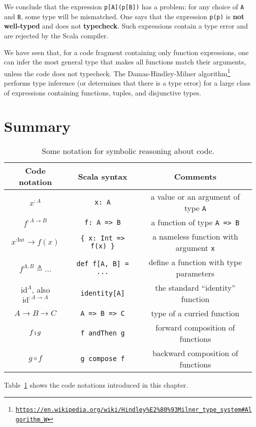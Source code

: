 We conclude that the expression \lstinline!p[A](p[B])! has a problem:
for any choice of \lstinline!A! and \lstinline!B!, some type will
be mismatched. One says that the expression \lstinline!p(p)! is \textbf{not
well-typed} and does not \textbf{typecheck}.
Such expressions contain a type error and are rejected by the Scala
compiler. 

We have seen that, for a code fragment containing only function expressions,
one can infer the most general type that makes all functions match
their arguments, unless the code does not typecheck. The Damas-Hindley-Milner
algorithm\footnote{\texttt{\href{https://en.wikipedia.org/wiki/Hindley\%E2\%80\%93Milner_type_system\#Algorithm_W}{https://en.wikipedia.org/wiki/Hindley\%E2\%80\%93Milner\_type\_system\#Algorithm\_W}}}
performs type inference (or determines that
there is a type error) for a large class of expressions containing
functions, tuples, and disjunctive types.

\section{Summary}

\begin{table}
\begin{centering}
\begin{tabular}{|c|c|c|}
\hline 
\textbf{\small{}Code notation} & \textbf{\small{}Scala syntax} & \textbf{\small{}Comments}\tabularnewline
\hline 
\hline 
{\small{}$x^{:A}$} & {\small{}}\lstinline!x: A! & {\small{}a value or an argument of type }\lstinline!A!\tabularnewline
\hline 
{\small{}$f^{:A\rightarrow B}$} & {\small{}}\lstinline!f: A => B! & {\small{}a function of type }\lstinline!A => B!\tabularnewline
\hline 
{\small{}$x^{:\text{Int}}\rightarrow f(x)$} & {\small{}}\lstinline!{ x: Int => f(x) }! & {\small{}a nameless function with argument }\lstinline!x!\tabularnewline
\hline 
{\small{}$f^{A,B}\triangleq...$} & {\small{}}\lstinline!def f[A, B] = ...! & {\small{}define a function with type parameters}\tabularnewline
\hline 
{\small{}$\text{id}^{A}$, also $\text{id}^{:A\rightarrow A}$} & {\small{}}\lstinline!identity[A]! & {\small{}the standard ``identity'' function}\tabularnewline
\hline 
{\small{}$A\rightarrow B\rightarrow C$} & {\small{}}\lstinline!A => B => C! & {\small{}type of a curried function}\tabularnewline
\hline 
{\small{}$f\bef g$} & {\small{}}\lstinline!f andThen g! & {\small{}forward composition of functions}\tabularnewline
\hline 
{\small{}$g\circ f$} & {\small{}}\lstinline!g compose f! & {\small{}backward composition of functions}\tabularnewline
\hline 
\end{tabular}
\par\end{centering}
\caption{Some notation for symbolic reasoning about code.\label{tab:Mathematical-notation-for-code}}
\end{table}
Table~\ref{tab:Mathematical-notation-for-code} shows the code notations
introduced in this chapter. 

